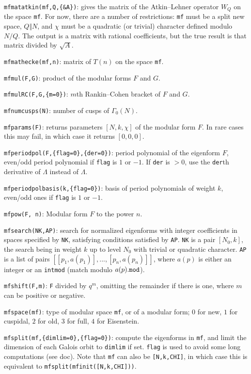 \documentclass[11pt]{article}
\newcommand{\G}{\Gamma}
\def\kbd#1{{\tt #1}}
\begin{document}
\kbd{mfmatatkin(mf,Q,\{\&A\})}: gives the matrix of the Atkin--Lehner operator
$W_Q$ on the space \kbd{mf}. For now, there are a number of restrictions:
\kbd{mf} must be a split new space, $Q\Vert N$, and $\chi$ must be a quadratic
(or trivial) character defined modulo $N/Q$. The output is a matrix with
rational coefficients, but the true result is that matrix divided by
$\sqrt{A}$.

\kbd{mfmathecke(mf,n)}: matrix of $T(n)$ on the space \kbd{mf}.

\kbd{mfmul(F,G)}: product of the modular forms $F$ and $G$.

\kbd{mfmulRC(F,G,\{m=0\})}: $m$th Rankin--Cohen bracket of $F$ and $G$.

\kbd{mfnumcusps(N)}: number of cusps of $\G_0(N)$.

\kbd{mfparams(F)}: returns parameters $[N,k,\chi]$ of the modular form $F$.
In rare cases this may fail, in which case it returns $[0,0,0]$.

\kbd{mfperiodpol(F,\{flag=0\},\{der=0\})}: period polynomial of the eigenform
$F$, even/odd period polynomial if \kbd{flag} is $1$ or $-1$. If \kbd{der}
is $>0$, use the \kbd{der}th derivative of $\Lambda$ instead of $\Lambda$.

\kbd{mfperiodpolbasis(k,\{flag=0\})}: basis of period polynomials of weight
$k$, even/odd ones if \kbd{flag} is $1$ or $-1$.

\kbd{mfpow(F, n)}: Modular form $F$ to the power $n$.

\kbd{mfsearch(NK,AP)}: search for normalized eigenforms with
integer coefficients in spaces specified by \kbd{NK}, satisfying conditions
satisfied by \kbd{AP}. \kbd{NK} is a pair $[N_0,k]$, the search being in
weight $k$ up to level $N_0$ with trivial or quadratic character.
\kbd{AP} is a list of pairs $[[p_1,a(p_1)],...,[p_n,a(p_n)]]$, where $a(p)$
is either an integer or an \kbd{intmod} (match modulo $a(p)\kbd{.mod}$).

\kbd{mfshift(F,m)}: \kbd{F} divided by $q^m$, omitting the remainder if there
is one, where $m$ can be positive or negative.

\kbd{mfspace(mf)}: type of modular space \kbd{mf}, or of a modular form;
$0$ for new, $1$ for cuspidal, $2$ for old, $3$ for full, $4$ for Eisenstein.

\kbd{mfsplit(mf,\{dimlim=0\},\{flag=0\})}: compute the eigenforms in \kbd{mf},
and limit the dimension of each Galois orbit to \kbd{dimlim} if set.
\kbd{flag} is used to avoid some long computations (see doc). Note that
\kbd{mf} can also be \kbd{[N,k,CHI]}, in which case this is equivalent to
\kbd{mfsplit(mfinit([N,k,CHI]))}.
\end{document}
